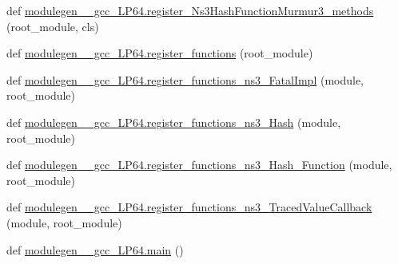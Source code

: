 \begin{DoxyCompactItemize}
\item 
def \hyperlink{namespacemodulegen____gcc__LP64_adca5cdfc5ab708e8c329dbbc45251f75}{modulegen\+\_\+\+\_\+gcc\+\_\+\+L\+P64.\+register\+\_\+\+Ns3\+Hash\+Function\+Murmur3\+\_\+methods} (root\+\_\+module, cls)
\item 
def \hyperlink{namespacemodulegen____gcc__LP64_aec4a5f753ed5fb80e971fb72341c9052}{modulegen\+\_\+\+\_\+gcc\+\_\+\+L\+P64.\+register\+\_\+functions} (root\+\_\+module)
\item 
def \hyperlink{namespacemodulegen____gcc__LP64_a50e31627c725d62dd753bad9b750a7a2}{modulegen\+\_\+\+\_\+gcc\+\_\+\+L\+P64.\+register\+\_\+functions\+\_\+ns3\+\_\+\+Fatal\+Impl} (module, root\+\_\+module)
\item 
def \hyperlink{namespacemodulegen____gcc__LP64_aaccaa7a88652c7cf1cbe4bae23dfd70f}{modulegen\+\_\+\+\_\+gcc\+\_\+\+L\+P64.\+register\+\_\+functions\+\_\+ns3\+\_\+\+Hash} (module, root\+\_\+module)
\item 
def \hyperlink{namespacemodulegen____gcc__LP64_ac5702d84dcfdab4237af2580ad57e6cd}{modulegen\+\_\+\+\_\+gcc\+\_\+\+L\+P64.\+register\+\_\+functions\+\_\+ns3\+\_\+\+Hash\+\_\+\+Function} (module, root\+\_\+module)
\item 
def \hyperlink{namespacemodulegen____gcc__LP64_a598936972a1d732adf3c766e058929eb}{modulegen\+\_\+\+\_\+gcc\+\_\+\+L\+P64.\+register\+\_\+functions\+\_\+ns3\+\_\+\+Traced\+Value\+Callback} (module, root\+\_\+module)
\item 
def \hyperlink{namespacemodulegen____gcc__LP64_a78c8b268d5fecc4d52d220f8954d0345}{modulegen\+\_\+\+\_\+gcc\+\_\+\+L\+P64.\+main} ()
\end{DoxyCompactItemize}
